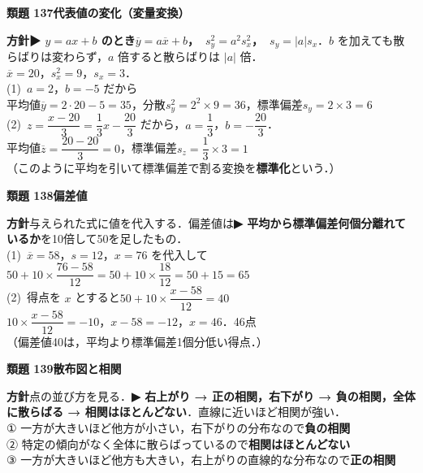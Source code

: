 \documentclass[a4paper,11pt]{ltjsarticle}
\newcommand{\ans}[2]{\Needspace{5\baselineskip}\vspace{6pt}%
  {\sffamily\bfseries 類題 #1\quad #2}\par}
\newcommand{\point}[1]{\textsf{\bfseries ▶ #1}}
\begin{document}
\ans{137}{代表値の変化（変量変換）}
\begin{kai}
\textbf{方針}\quad \point{$y=ax+b$ のとき\quad $\overline y=a\overline x+b$，\ $s_y^2=a^2s_x^2$，\ $s_y=|a|s_x$}．$b$ を加えても散らばりは変わらず，$a$ 倍すると散らばりは $|a|$ 倍．\\[2pt]
$\overline x=20$，$s_x^2=9$，$s_x=3$．\\[2pt]
(1)\ $a=2$，$b=-5$ だから\\
\hspace*{1.5em}平均値\quad $\overline y=2\cdot20-5=35$，\quad 分散\quad $s_y^2=2^2\times9=36$，\quad 標準偏差\quad $s_y=2\times3=6$\\[2pt]
(2)\ $z=\dfrac{x-20}{3}=\dfrac13x-\dfrac{20}{3}$ だから，$a=\dfrac13$，$b=-\dfrac{20}3$．\\
\hspace*{1.5em}平均値\quad $\overline z=\dfrac{20-20}{3}=0$，\quad 標準偏差\quad $s_z=\dfrac13\times3=1$\\
\hspace*{1.5em}（このように平均を引いて標準偏差で割る変換を\textbf{標準化}という．）
\end{kai}

\ans{138}{偏差値}
\begin{kai}
\textbf{方針}\quad 与えられた式に値を代入する．偏差値は\point{平均から標準偏差何個分離れているか}を10倍して50を足したもの．\\[2pt]
(1)\ $\overline x=58$，$s=12$，$x=76$ を代入して\\
\hspace*{1.5em}$50+10\times\dfrac{76-58}{12}=50+10\times\dfrac{18}{12}=50+15=65$\\[2pt]
(2)\ 得点を $x$ とすると\quad $50+10\times\dfrac{x-58}{12}=40$\\
\hspace*{1.5em}$10\times\dfrac{x-58}{12}=-10$，\quad $x-58=-12$，\quad $x=46$．\quad 46点\\
\hspace*{1.5em}（偏差値40は，平均より標準偏差1個分低い得点．）
\end{kai}

\ans{139}{散布図と相関}
\begin{kai}
\textbf{方針}\quad 点の並び方を見る．\point{右上がり → 正の相関，右下がり → 負の相関，全体に散らばる → 相関はほとんどない}．直線に近いほど相関が強い．\\[2pt]
① 一方が大きいほど他方が小さい，右下がりの分布なので\quad \textbf{負の相関}\\
② 特定の傾向がなく全体に散らばっているので\quad \textbf{相関はほとんどない}\\
③ 一方が大きいほど他方も大きい，右上がりの直線的な分布なので\quad \textbf{正の相関}
\end{kai}
\end{document}
